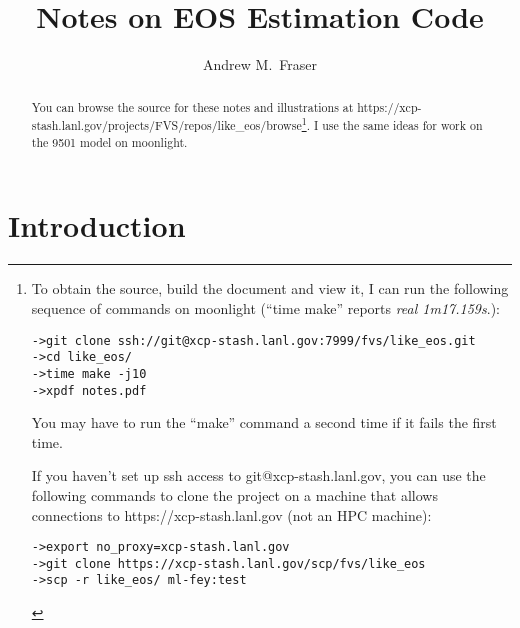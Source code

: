 \documentclass[11pt]{article}
\title{Notes on EOS Estimation Code}
\author{Andrew M.\ Fraser}
\begin{document}
\maketitle
\begin{abstract}
  You can browse the source for these notes and illustrations at
  https://xcp-stash.lanl.gov/projects/FVS/repos/like\_eos/browse\footnote{To
    obtain the source, build the document and view it, I can run the
    following sequence of commands on moonlight (``time make'' reports
    \emph{real 1m17.159s}.):
\begin{verbatim}
->git clone ssh://git@xcp-stash.lanl.gov:7999/fvs/like_eos.git
->cd like_eos/
->time make -j10
->xpdf notes.pdf
\end{verbatim}
    You may have to run the ``make'' command a second time if it fails
    the first time.

    If you haven't set up ssh access to git@xcp-stash.lanl.gov, you
    can use the following commands to clone the project on a machine
    that allows connections to https://xcp-stash.lanl.gov (not an HPC
    machine):
\begin{verbatim}
->export no_proxy=xcp-stash.lanl.gov
->git clone https://xcp-stash.lanl.gov/scp/fvs/like_eos
->scp -r like_eos/ ml-fey:test
\end{verbatim}
  }.  I use the same ideas for work on the 9501 model on moonlight.
\end{abstract}

\section{Introduction}
\label{sec:introduction}
\end{document}

